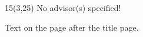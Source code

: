 \documentclass{book}
\begin{document}
\begin{titlepage}
\begin{textblock}{15}(3,25)
\centering
\color{red}No advisor(s) specified!\\
\end{textblock}
\null
\end{titlepage}
Text on the page after the title page.


\end{document}
